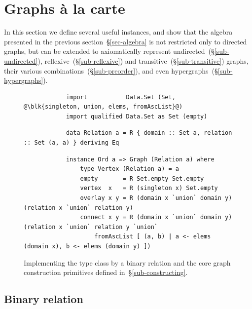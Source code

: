 \section{Graphs \`{a} la carte}\label{sec-a-la-carte}

In this section we define several useful  instances, and
show that the algebra presented in the previous section~\S\ref{sec-algebra} is
not restricted only
to directed graphs, but can be extended to axiomatically represent
undirected~(\S\ref{sub-undirected}), reflexive~(\S\ref{sub-reflexive})
and transitive~(\S\ref{sub-transitive}) graphs, their various
combinations~(\S\ref{sub-preorder}), and even hypergraphs~(\S\ref{sub-hypergraphs}).

\begin{figure}
\begin{verbatim}
            import           Data.Set (Set, @\blk{singleton, union, elems, fromAscList}@)
            import qualified Data.Set as Set (empty)
\end{verbatim}
\vspace{1mm}
\begin{verbatim}
            data Relation a = R { domain :: Set a, relation :: Set (a, a) } deriving Eq
\end{verbatim}
\vspace{1mm}
\begin{verbatim}
            instance Ord a => Graph (Relation a) where
                type Vertex (Relation a) = a
                empty       = R Set.empty Set.empty
                vertex  x   = R (singleton x) Set.empty
                overlay x y = R (domain x `union` domain y) (relation x `union` relation y)
                connect x y = R (domain x `union` domain y) (relation x `union` relation y `union`
                    fromAscList [ (a, b) | a <- elems (domain x), b <- elems (domain y) ])
\end{verbatim}
\vspace{-2mm}
\caption{Implementing the  type class by a binary relation
and the core graph construction primitives
defined in~\S\ref{sub-constructing}.\label{fig-relation}}
\vspace{-2mm}
\end{figure}

\subsection{Binary relation}\label{sub-relation}


